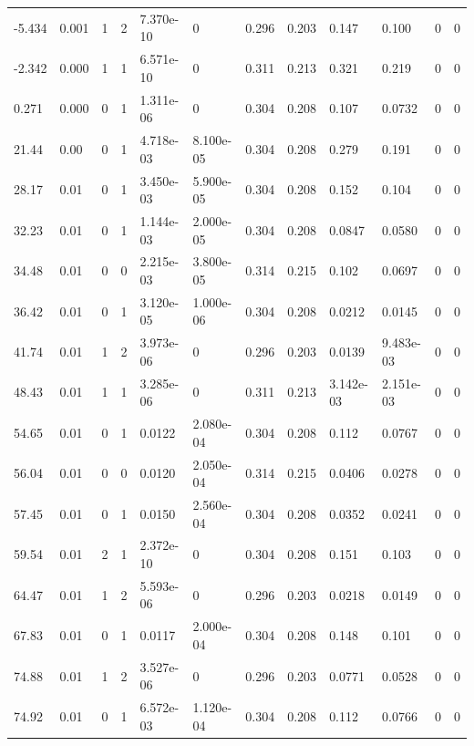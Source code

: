 \documentclass[preview]{standalone}
\begin{document}
{{\begin{tabular}{L{1.2cm}C{1.2cm} C{0.3cm}C{0.5cm} C{1.4cm}C{1.4cm} C{1.4cm}C{1.4cm} C{1.6cm}C{1.6cm} C{1.6cm}C{1.6cm}}
  -5.434  &  0.001  & 1     &  2 &  7.370e-10  & 0  &  0.296&   0.203& 0.147 & 0.100   &  0 & 0  \\ 
  -2.342  &  0.000  & 1     &  1 &  6.571e-10  & 0  &  0.311&   0.213& 0.321 & 0.219   &  0 & 0  \\ 
  0.271  &  0.000  & 0     &  1 &  1.311e-06  & 0  &  0.304&   0.208& 0.107 & 0.0732   &  0 & 0  \\ 
  21.44  &  0.00  & 0     &  1 &  4.718e-03  & 8.100e-05  &  0.304&   0.208& 0.279 & 0.191   &  0 & 0  \\ 
  28.17  &  0.01  & 0     &  1 &  3.450e-03  & 5.900e-05  &  0.304&   0.208& 0.152 & 0.104   &  0 & 0  \\ 
  32.23  &  0.01  & 0     &  1 &  1.144e-03  & 2.000e-05  &  0.304&   0.208& 0.0847 & 0.0580   &  0 & 0  \\ 
  34.48  &  0.01  & 0     &  0 &  2.215e-03  & 3.800e-05  &  0.314&   0.215& 0.102 & 0.0697   &  0 & 0  \\ 
  36.42  &  0.01  & 0     &  1 &  3.120e-05  & 1.000e-06  &  0.304&   0.208& 0.0212 & 0.0145   &  0 & 0  \\ 
  41.74  &  0.01  & 1     &  2 &  3.973e-06  & 0  &  0.296&   0.203& 0.0139 & 9.483e-03   &  0 & 0  \\ 
  48.43  &  0.01  & 1     &  1 &  3.285e-06  & 0  &  0.311&   0.213& 3.142e-03 & 2.151e-03   &  0 & 0  \\ 
  54.65  &  0.01  & 0     &  1 &  0.0122  & 2.080e-04  &  0.304&   0.208& 0.112 & 0.0767   &  0 & 0  \\ 
  56.04  &  0.01  & 0     &  0 &  0.0120  & 2.050e-04  &  0.314&   0.215& 0.0406 & 0.0278   &  0 & 0  \\ 
  57.45  &  0.01  & 0     &  1 &  0.0150  & 2.560e-04  &  0.304&   0.208& 0.0352 & 0.0241   &  0 & 0  \\ 
  59.54  &  0.01  & 2     &  1 &  2.372e-10  & 0  &  0.304&   0.208& 0.151 & 0.103   &  0 & 0  \\ 
  64.47  &  0.01  & 1     &  2 &  5.593e-06  & 0  &  0.296&   0.203& 0.0218 & 0.0149   &  0 & 0  \\ 
  67.83  &  0.01  & 0     &  1 &  0.0117  & 2.000e-04  &  0.304&   0.208& 0.148 & 0.101   &  0 & 0  \\ 
  74.88  &  0.01  & 1     &  2 &  3.527e-06  & 0  &  0.296&   0.203& 0.0771 & 0.0528   &  0 & 0  \\ 
  74.92  &  0.01  & 0     &  1 &  6.572e-03  & 1.120e-04  &  0.304&   0.208& 0.112 & 0.0766   &  0 & 0  \\ 

\end{tabular}}}
\end{document}
